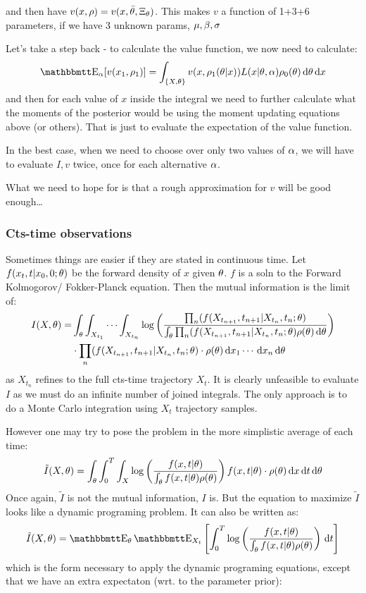 \documentclass{article}
\begin{document}
and then have $v(x, \rho) = v(x, \bar {{\theta}} ,\Xi_{\theta})$. This makes $v$ a function
of 1+3+6 parameters, if we have 3 unknown params, ${\mu },{\beta},{\sigma }$

Let's take a step back - to calculate the value function, we now need to
calculate:
$$ \Exp_\a [ v(x_1, \rho_1)] =
\int_{\{X, \th\}} v(x, \rho_1(\th|x)) L(x|\th, \a) \rho_0(\th)
\intd{\th}
\intd{x}
$$
and then for each value of $x$ inside the integral we need to further calculate
what the moments of the posterior would be using the moment updating equations
above (or others). That is just to evaluate the expectation of the value
function.

In the best case, when we need to choose over only two values of ${\alpha}$, we will
have to evaluate $I, v$ twice, once for each alternative ${\alpha}$. 

What we need to hope for is that a rough approximation for $v$ will be good
enough\ldots

\subsubsection{Cts-time observations}
Sometimes things are easier if they are stated in continuous time. Let $f(x_t,t|
x_0, 0 ; {\theta})$ be the forward density of $x$ given ${\theta}$. $f$ is a soln to the
Forward Kolmogorov/ Fokker-Planck equation. Then the mutual information is the
limit of:
\begin{align*}
I(X,{\theta}) =& \int_{\theta} \int_{X_{t_1}}\cdots\int_{X_{t_n}}
 \log
 \left(\frac{\prod_n (f(X_{t_{n+1}},t_{n+1}|X_{t_{n }},t_{n} ;{\theta})}
 {\int_{\theta} \prod_n (f(X_{t_{n+1}},t_{n+1}|X_{t_{n }},t_{n} ;{\theta})
 \rho({\theta}) \, \mathrm{d} {\theta} }\right) 
 \\&\cdot 
 \prod_n (f(X_{t_{n+1}},t_{n+1}|X_{t_{n }},t_{n} ;{\theta}) 
 \cdot \rho({\theta}) \, \mathrm{d} x_1\cdots\, \mathrm{d} x_n\, \mathrm{d} {\theta} 
 \end{align*}
as $X_{t_n}$ refines to the full cts-time trajectory $X_t$. It is clearly unfeasible to evaluate $I$ as we must do an infinite number of joined integrals.
The only approach is to do a Monte Carlo integration using $X_t$ trajectory
samples.

However one may try to pose the problem in the more simplistic average of each
time:
$$
\tilde I(X,{\theta}) = \int_{\theta} \int_0^T\int_X
 \log\left(\frac{f(x,t|{\theta} )}{\int_{\theta} f(x,t|{\theta}) \rho({\theta})}\right) 
 f(x,t|{\theta}) \cdot \rho({\theta}) \, \mathrm{d} x\, \mathrm{d} t\, \mathrm{d} {\theta}
$$
Once again, $\tilde I$ is not the mutual information, $I$ is. But the equation
to maximize $\tilde I$ looks like a dynamic programing problem. It can also be
written as:
$$
\tilde I(X,\th) = \Exp_{\th} \Exp_{X_t}
\left[ \int_0^T \log\left(\frac{f(x,t|\th )}
{\int_\th f(x,t|\th) \rho(\th)}\right) \intd{t} \right]
$$
which is the form necessary to apply the dynamic programing equations, except
that we have an extra expectaton (wrt. to the parameter prior):
\end{document}
